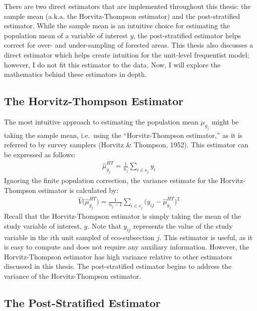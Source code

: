 \documentclass[12pt,twoside]{reedthesis}
\begin{document}
There are two direct estimators that are implemented throughout this thesis: the sample mean (a.k.a. the Horvitz-Thompson estimator) and the post-stratified estimator. While the sample mean is an intuitive choice for estimating the population mean of a variable of interest \(y\), the post-stratified estimator helps correct for over- and under-sampling of forested areas. This thesis also discusses a direct estimator which helps create intuition for the unit-level frequentist model; however, I do not fit this estimator to the data. Now, I will explore the mathematics behind these estimators in depth.

\hypertarget{the-horvitz-thompson-estimator}{%
\subsection{The Horvitz-Thompson Estimator}\label{the-horvitz-thompson-estimator}}

The most intuitive approach to estimating the population mean \(\mu_{y_j}\) might be taking the sample mean, i.e.~using the ``Horvitz-Thompson estimator,'' as it is referred to by survey samplers (Horvitz \& Thompson, 1952). This estimator can be expressed as follows:
\begin{align}
\hat\mu_{y_j}^{HT} = \frac{1}{n_j} \sum_{i \in s_j} y_i
\end{align}
Ignoring the finite population correction, the variance estimate for the Horvitz-Thompson estimator is calculated by:
\begin{align}
\hat V\Big(\hat\mu_{y_j}^{HT}\Big) = \frac{1}{n_j-1} \sum_{i \in s_j} \Big(y_{ij} - \hat\mu_{y_j}^{HT}\Big)^2
\end{align}
Recall that the Horvitz-Thompson estimator is simply taking the mean of the study variable of interest, \(y\). Note that \(y_{ij}\) represents the value of the study variable in the \(i\)th unit sampled of eco-subsection \(j\). This estimator is useful, as it is easy to compute and does not require any auxiliary information. However, the Horvitz-Thompson estimator has high variance relative to other estimators discussed in this thesis. The post-stratified estimator begins to address the variance of the Horvitz-Thompson estimator.

\hypertarget{the-post-stratified-estimator}{%
\subsection{The Post-Stratified Estimator}\label{the-post-stratified-estimator}}
\end{document}
